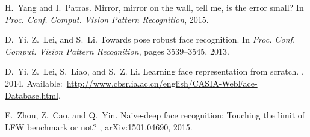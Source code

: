 \documentclass[runningheads]{llncs}
\begin{document}
\begin{thebibliography}{10}
H.~Yang and I.~Patras.
\newblock Mirror, mirror on the wall, tell me, is the error small?
\newblock In {\em Proc. Conf. Comput. Vision Pattern Recognition}, 2015.

D.~Yi, Z.~Lei, and S.~Li.
\newblock Towards pose robust face recognition.
\newblock In {\em Proc. Conf. Comput. Vision Pattern Recognition}, pages
  3539--3545, 2013.

D.~Yi, Z.~Lei, S.~Liao, and S.~Z. Li.
\newblock Learning face representation from scratch.
, 2014.
\newblock
  Available:~\url{http://www.cbsr.ia.ac.cn/english/CASIA-WebFace-Database.html}.

E.~Zhou, Z.~Cao, and Q.~Yin.
\newblock Naive-deep face recognition: Touching the limit of {LFW} benchmark or
  not?
, arXiv:1501.04690, 2015.

\end{thebibliography}
\end{document}
